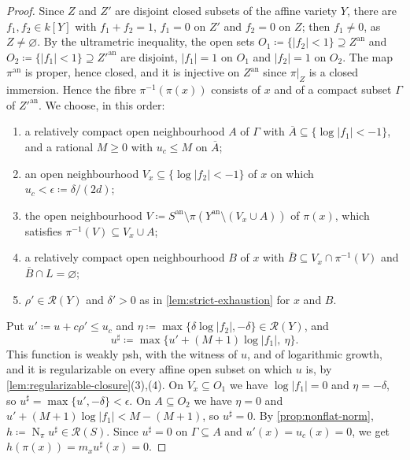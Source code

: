 \documentclass[11pt,a4paper]{article}
\newcommand{\an}{\mathrm{an}}          %
\newcommand{\Norm}{\operatorname{N}}
\begin{document}
\begin{proof}
Since $Z$ and $Z'$ are disjoint closed subsets of the affine variety $Y$, there are $f_1,f_2\in k[Y]$ with $f_1+f_2=1$, $f_1=0$ on $Z'$ and $f_2=0$ on $Z$; then $f_1\ne0$, as $Z\ne\varnothing$. By the ultrametric inequality, the open sets $O_1\coloneqq\{|f_2|<1\}\supseteq Z^{\an}$ and $O_2\coloneqq\{|f_1|<1\}\supseteq Z'^{\an}$ are disjoint, $|f_1|=1$ on $O_1$ and $|f_2|=1$ on $O_2$. The map $\pi^{\an}$ is proper, hence closed, and it is injective on $Z^{\an}$ since $\pi|_Z$ is a closed immersion. Hence the fibre $\pi^{-1}(\pi(x))$ consists of $x$ and of a compact subset $\Gamma$ of $Z'^{\an}$. We choose, in this order:
\begin{enumerate}
\item a relatively compact open neighbourhood $A$ of $\Gamma$ with $\overline A\subseteq\{\log|f_1|<-1\}$, and a rational $M\ge0$ with $u_c\le M$ on $\overline A$;
\item an open neighbourhood $V_x\subseteq\{\log|f_2|<-1\}$ of $x$ on which $u_c<\epsilon\coloneqq\delta/(2d)$;
\item the open neighbourhood $V\coloneqq S^{\an}\setminus\pi(Y^{\an}\setminus(V_x\cup A))$ of $\pi(x)$, which satisfies $\pi^{-1}(V)\subseteq V_x\cup A$;
\item a relatively compact open neighbourhood $B$ of $x$ with $\overline B\subseteq V_x\cap\pi^{-1}(V)$ and $\overline B\cap L=\varnothing$;
\item $\rho'\in\mathcal{R}(Y)$ and $\delta'>0$ as in \cref{lem:strict-exhaustion} for $x$ and $B$.
\end{enumerate}
Put $u'\coloneqq u+c\rho'\le u_c$ and $\eta\coloneqq\max\{\delta\log|f_2|,-\delta\}\in\mathcal{R}(Y)$, and
\[
u^\sharp\coloneqq\max\bigl\{u'+(M+1)\log|f_1|,\ \eta\bigr\}.
\]
This function is weakly psh, with the witness of $u$, and of logarithmic growth, and it is regularizable on every affine open subset on which $u$ is, by \cref{lem:regularizable-closure}(3),(4). On $V_x\subseteq O_1$ we have $\log|f_1|=0$ and $\eta=-\delta$, so $u^\sharp=\max\{u',-\delta\}<\epsilon$. On $A\subseteq O_2$ we have $\eta=0$ and $u'+(M+1)\log|f_1|<M-(M+1)$, so $u^\sharp=0$. By \cref{prop:nonflat-norm}, $h\coloneqq\Norm_\pi u^\sharp\in\mathcal{R}(S)$. Since $u^\sharp=0$ on $\Gamma\subseteq A$ and $u'(x)=u_c(x)=0$, we get $h(\pi(x))=m_x u^\sharp(x)=0$.


\end{proof}
\end{document}
